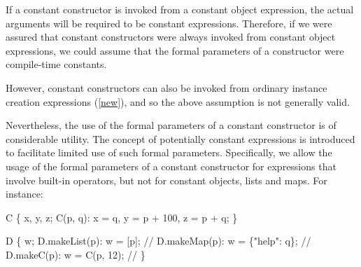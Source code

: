 \documentclass[makeidx]{article}
\begin{document}
{{If a constant constructor is invoked from a constant object expression,
the actual arguments will be required to be constant expressions.
Therefore, if we were assured that
constant constructors were always invoked from constant object expressions,
we could assume that the formal parameters of a constructor were
compile-time constants.

However, constant constructors can also be invoked from
ordinary instance creation expressions (\ref{new}),
and so the above assumption is not generally valid.

Nevertheless, the use of the formal parameters of a constant constructor
is of considerable utility.
The concept of potentially constant expressions is introduced to facilitate
limited use of such formal parameters.
Specifically, we allow the usage of
the formal parameters of a constant constructor
for expressions that involve built-in operators,
but not for constant objects, lists and maps.
For instance:%
}

\begin{dartCode}
\CLASS{} C \{
  \FINAL{} x, y, z;
  \CONST{} C(p, q): x = q, y = p + 100, z = p + q;
\}
\end{dartCode}


\begin{dartCode}
\CLASS{} D \{
  \FINAL{} w;
  \CONST{} D.makeList(p): w = \CONST{} [p]; // 
  \CONST{} D.makeMap(p): w = \CONST{} \{"help": q\}; // 
  \CONST{} D.makeC(p): w = \CONST{} C(p, 12); // 
\}
\end{dartCode}


}
\end{document}
